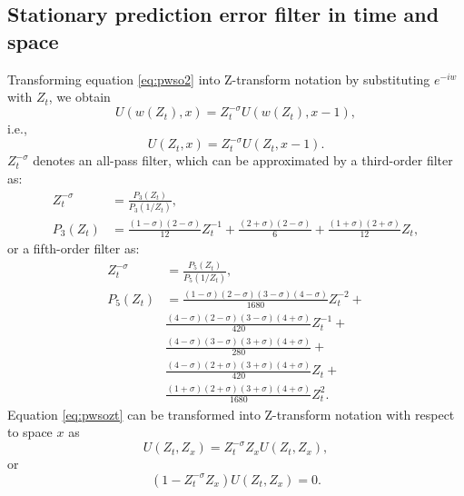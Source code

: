 \subsection{Stationary prediction error filter in time and space}
 Transforming equation \ref{eq:pwso2} into Z-transform notation by substituting $e^{-iw}$ with $Z_t$, we obtain
\begin{equation}
\label{eq:pwsozt}
U(w(Z_t),x) = Z_t^{-\sigma} U(w(Z_t),x-1),
\end{equation}
i.e.,
\begin{equation}
\label{eq:pwsozt}
U(Z_t,x) = Z_t^{-\sigma} U(Z_t,x-1).
\end{equation}
$Z_t^{-\sigma}$ denotes an all-pass filter, which can be approximated \cite[]{fomel2002pwd} by a third-order filter as:
\begin{equation}
\label{eq:three}
\begin{split}
Z_t^{-\sigma} &= \frac{P_3(Z_t)}{P_3(1/Z_t)},\\
P_3(Z_t) &= \frac{(1-\sigma)(2-\sigma)}{12} Z_t^{-1} + \frac{(2+\sigma)(2-\sigma)}{6} +  \frac{(1+\sigma)(2+\sigma)}{12} Z_t,
\end{split}
\end{equation}
or a fifth-order filter as:
\begin{equation}
\label{eq:five}
\begin{split}
Z_t^{-\sigma} &= \frac{P_5(Z_t)}{P_5(1/Z_t)},\\
P_5(Z_t) &= \frac{(1-\sigma)(2-\sigma)(3-\sigma)(4-\sigma)}{1680} Z_t^{-2} + \\
&\frac{(4-\sigma)(2-\sigma)(3-\sigma)(4+\sigma)}{420} Z_t^{-1}+ \\
&\frac{(4-\sigma)(3-\sigma)(3+\sigma)(4+\sigma)}{280} + \\
&\frac{(4-\sigma)(2+\sigma)(3+\sigma)(4+\sigma)}{420} Z_t + \\
&\frac{(1+\sigma)(2+\sigma)(3+\sigma)(4+\sigma)}{1680} Z_t^{2}.
\end{split}
\end{equation}
Equation \ref{eq:pwsozt} can be transformed into Z-transform notation with respect to space $x$ as 
\begin{equation}
\label{eq:pwsoztzx}
U(Z_t,Z_x) = Z_t^{-\sigma} Z_x U(Z_t,Z_x),
\end{equation}
or 
\begin{equation}
\label{eq:pwsoztzx1}
(1-Z_t^{-\sigma} Z_x) U(Z_t,Z_x) = 0.
\end{equation}

